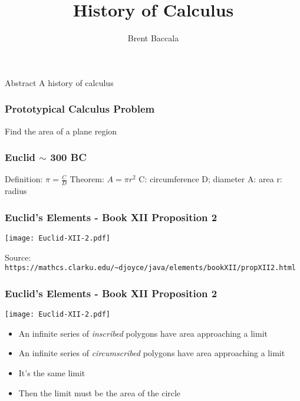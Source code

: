\documentclass{beamer}
\title{History of Calculus}
\author{Brent Baccala}
\institute{\tt cosine@freesoft.org}
\begin{document}
\begin{frame}
\titlepage
\begin{block}{Abstract}
A history of calculus
\end{block}
\end{frame}

\begin{frame}
\frametitle{Prototypical Calculus Problem}
\begin{center}
Find the area of a plane region


\end{center}
\end{frame}

\begin{frame}
\frametitle{Euclid $\sim$ 300 BC}

Definition: $\pi = \frac{C}{D}$
Theorem: $A = \pi r^2$
C: circumference
D; diameter
A: area
r: radius

\end{frame}

\begin{frame}
\frametitle{Euclid's Elements - Book XII Proposition 2}

\texttt{[image: Euclid-XII-2.pdf]}


{\scriptsize Source: {\tt https://mathcs.clarku.edu/\textasciitilde djoyce/java/elements/bookXII/propXII2.html}}
\end{frame}

\begin{frame}
\frametitle{Euclid's Elements - Book XII Proposition 2}

\texttt{[image: Euclid-XII-2.pdf]}


\begin{itemize}
\item An infinite series of {\it inscribed} polygons have area approaching a limit
\item An infinite series of {\it circumscribed} polygons have area approaching a limit
\item It's the same limit
\item Then the limit must be the area of the circle
\end{itemize}

\end{frame}
\end{document}
